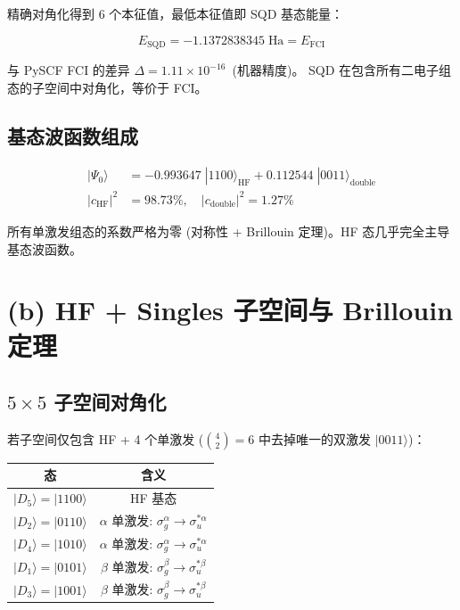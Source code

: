 \documentclass[fontset=mac]{ctexart}
\newcommand{\ket}[1]{|#1\rangle}
\begin{document}
精确对角化得到 6 个本征值，最低本征值即 SQD 基态能量：

\begin{equation}
    \boxed{E_{\text{SQD}} = -1.1372838345\;\text{Ha} = E_{\text{FCI}}}
\end{equation}

与 PySCF FCI 的差异 $\Delta = 1.11\times 10^{-16}$\, (机器精度)。
SQD 在包含所有二电子组态的子空间中对角化，等价于 FCI。

\subsection*{基态波函数组成}

\begin{align}
    \ket{\Psi_0} &= -0.993647\;\ket{1100}_{\text{HF}} + 0.112544\;\ket{0011}_{\text{double}} \\
    |c_{\text{HF}}|^2 &= 98.73\%,\quad |c_{\text{double}}|^2 = 1.27\%
\end{align}

所有单激发组态的系数严格为零 (对称性 + Brillouin 定理)。HF 态几乎完全主导基态波函数。

\newpage

\section*{(b) HF + Singles 子空间与 Brillouin 定理}

\subsection*{$5\times 5$ 子空间对角化}

若子空间仅包含 HF + 4 个单激发 ($\binom{4}{2}=6$ 中去掉唯一的双激发 $\ket{0011}$)：

\begin{table}[H]
\centering
\begin{tabular}{c|c}
\toprule
态 & 含义 \\
\midrule
$\ket{D_5} = \ket{1100}$ & HF 基态 \\
$\ket{D_2} = \ket{0110}$ & $\alpha$ 单激发: $\sigma_g^\alpha \to \sigma_u^{*\alpha}$ \\
$\ket{D_4} = \ket{1010}$ & $\alpha$ 单激发: $\sigma_g^\alpha \to \sigma_u^{*\alpha}$ \\
$\ket{D_1} = \ket{0101}$ & $\beta$ 单激发: $\sigma_g^\beta \to \sigma_u^{*\beta}$ \\
$\ket{D_3} = \ket{1001}$ & $\beta$ 单激发: $\sigma_g^\beta \to \sigma_u^{*\beta}$ \\
\bottomrule
\end{tabular}
\end{table}
\end{document}
